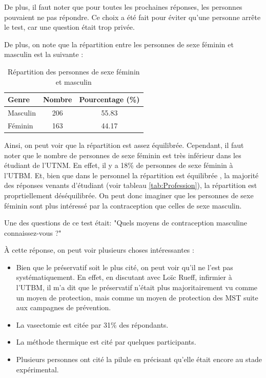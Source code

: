 \documentclass[12pt,a4paper]{report}
\begin{document}
De plus, il faut noter que pour toutes les prochaines réponses, les personnes pouvaient ne pas répondre.
Ce choix a été fait pour éviter qu'une personne arrête le test, car une question était trop privée.

De plus, on note que la répartition entre les personnes de sexe féminin et masculin est la suivante :

\begin{table}[H]
    \centering
    \begin{tabular}{|l|c|c|}
    \hline
    \textbf{Genre} & \textbf{Nombre} & \textbf{Pourcentage (\%)} \\
    \hline
    Masculin & 206 & 55.83 \\
    Féminin & 163 & 44.17 \\
    \hline
\end{tabular}
\caption{Répartition des personnes de sexe féminin et masculin}
\end{table}

Ainsi, on peut voir que la répartition est assez équilibrée. Cependant, il faut noter que le nombre de personnes de sexe féminin est très inférieur dans les étudiant de l'UTNM.
En effet, il y a 18\% de personnes de sexe féminin à l'UTBM. \cite{UTBMClassementEcoles}
Et, bien que dans le personnel la répartition est équilibrée \cite{RapportSocial20202020}, la majorité des réponses venants d'étudiant (voir tableau \ref{tab:Profession}), la répartition est proprtiellement déséquilibrée.
On peut donc imaginer que les personnes de sexe féminin sont plus intéressé par la contraception que celles de sexe masculin.

Une des questions de ce test était: "Quels moyens de contraception masculine connaissez-vous ?"

À cette réponse, on peut voir plusieurs choses intéressantes :
\begin{itemize}
    \item Bien que le préservatif soit le plus cité, on peut voir qu'il ne l'est pas systématiquement. En effet, en discutant avec Loïc Rueff, infirmier à l'UTBM, il m'a dit que le préservatif n'était plus majoritairement vu comme un moyen de protection, mais comme un moyen de protection des MST suite aux campagnes de prévention.
    \item La vasectomie est citée par 31\% des répondants.
    \item La méthode thermique est cité par quelques participants.
    \item Plusieurs personnes ont cité la pilule en précisant qu'elle était encore au stade expérimental.
\end{itemize}
\end{document}
